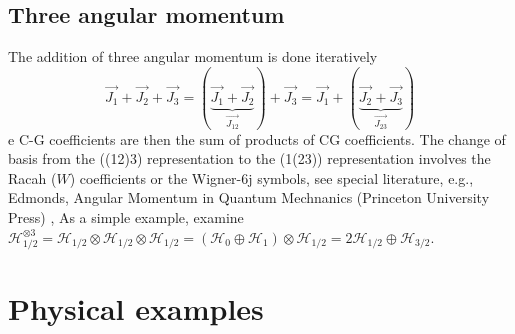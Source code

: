 \subsection{Three angular momentum}
The addition of three angular momentum is done iteratively
\begin{equation}
    \overrightarrow{J_{1}}+\overrightarrow{J_{2}}+\overrightarrow{J_{3}}=(\underbrace{\overrightarrow{J_{1}}+\overrightarrow{J_{2}}}_{\overrightarrow{J_{12}}})+\overrightarrow{J_{3}}=\overrightarrow{J_{1}}+(\underbrace{\overrightarrow{J_{2}}+\overrightarrow{J_{3}}}_{\overrightarrow{J_{23}}})
    \end{equation}
e C-G coefficients are then the sum of products of CG coefficients. The change of basis from the ((12)3) representation to the (1(23)) representation involves the Racah ($W$) coefficients or the Wigner-6j symbols, see special literature, e.g., Edmonds, Angular Momentum in Quantum Mechnanics (Princeton University Press) , As a simple example, examine $\mathcal{H}^{\otimes 3}_{1 / 2} = \mathcal{H}_{1/2} \otimes \mathcal{H}_{1/2} \otimes \mathcal{H}_{1/2} = (\mathcal{H}_0 \oplus \mathcal{H}_1) \otimes \mathcal{H}_{1/2} = 2\mathcal{H}_{1/2} \oplus \mathcal{H}_{3 / 2}$.
\section{ Physical examples}
